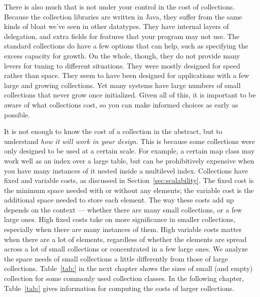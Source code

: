 There is also much that is not under your control in the cost
of collections.
Because the collection libraries are written in Java, they suffer
from the same kinds of bloat we've seen in other datatypes. They have
internal layers of delegation, and extra fields for features that your program may not use. The standard
collections do have a few options that can help, such as
specifying the excess capacity for growth. On the whole, though, they do not
provide many levers for tuning to different situations. They were mostly
designed for speed rather than space.  They seem to have been designed for
applications with a few large and growing collections. Yet many systems have large numbers
of small collections that never grow once initialized. Given all of this, it is important
to be aware of what collections cost, so you can make informed choices as early as possible. 

It is not enough to know the cost of a collection in the abstract, but to
understand \emph{how it will work in your design}. This is because some
collections were only designed to be used at a certain scale. 
For example, a certain map class may work
well as an index over a large table, but can be prohibitively expensive when you
have many instances of it nested inside a multilevel index. Collections have fixed and
variable costs, as discussed in Section~\ref{sec:scalability}. 
The fixed cost is the minimum space needed with or
without any elements; the variable cost is the additional space needed to
store each element. The way these costs add up
depends on the context ---
whether there are many small collections, or a few large ones. 
High fixed costs take on more significance in smaller collections,
especially when there are many instances of them. High variable costs matter
when there are a lot of elements, regardless of whether the elements are spread across
a lot of small collections or concentrated in a few large ones.
We analyze the space needs of small collections a little differently
from those of large collections. Table~\ref{tab:} in the next chapter shows the
sizes of small (and empty) collection for some commonly used collection classes. 
In the following chapter, Table~\ref{tab:} gives
information for computing the costs of larger collections.





